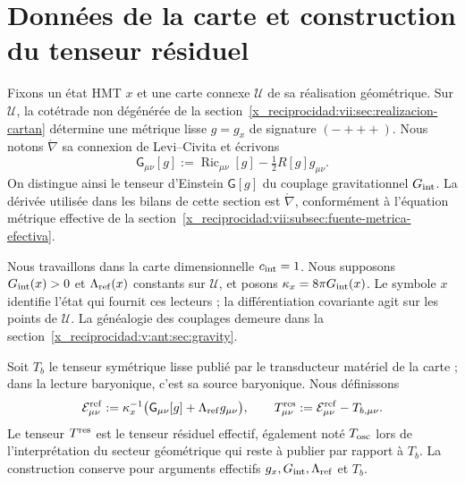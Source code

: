 \section{Données de la carte et construction du tenseur résiduel}
\label{x_reciprocidad:vii:subsec:datos-tensor-residual}

Fixons un état HMT \(x\) et une carte connexe \(\mathcal U\) de sa
réalisation géométrique. Sur \(\mathcal U\), la cotétrade non dégénérée
de la section~\ref{x_reciprocidad:vii:sec:realizacion-cartan} détermine une métrique lisse
\(g=g_x\) de signature \((-+++)\). Nous notons
\(\mathring\nabla\) sa connexion de Levi--Civita et écrivons
\[
 \mathsf G_{\mu\nu}[g]
 :=\operatorname{Ric}_{\mu\nu}[g]-\tfrac12R[g]g_{\mu\nu}.
\]
On distingue ainsi le tenseur d'Einstein \(\mathsf G[g]\) du couplage
gravitationnel \(G_{\rm int}\). La dérivée utilisée dans les bilans
de cette section est \(\mathring\nabla\), conformément à l'équation
métrique effective de la section~\ref{x_reciprocidad:vii:subsec:fuente-metrica-efectiva}.

Nous travaillons dans la carte dimensionnelle \(c_{\rm int}=1\). Nous supposons \(G_{\rm int}(x)>0\) et \(\Lambda_{\rm ref}(x)\) constants sur \(\mathcal U\), et posons \(\kappa_x=8\pi G_{\rm int}(x)\). Le symbole \(x\) identifie l'état qui fournit ces lecteurs ; la différentiation covariante agit sur les points de \(\mathcal U\). La généalogie des couplages demeure dans la section~\ref{x_reciprocidad:v:ant:sec:gravity}.

Soit \(T_b\) le tenseur symétrique lisse publié par le transducteur matériel
de la carte ; dans la lecture baryonique, c'est sa source baryonique. Nous définissons
\begin{equation}
 \mathcal E^{\rm ref}_{\mu\nu}
 :=\kappa_x^{-1}\bigl(\mathsf G_{\mu\nu}[g]
                            +\Lambda_{\rm ref}g_{\mu\nu}\bigr),
 \qquad
 T^{\rm res}_{\mu\nu}:=\mathcal E^{\rm ref}_{\mu\nu}-T_{b,\mu\nu}.
 \label{x_reciprocidad:vii:eq:residual-definicion}
\end{equation}
Le tenseur \(T^{\rm res}\) est le tenseur résiduel effectif, également
noté \(T_{\rm osc}\) lors de l'interprétation du secteur géométrique qui reste
à publier par rapport à \(T_b\). La construction conserve pour
arguments effectifs \(g_x,G_{\rm int},\Lambda_{\rm ref}\) et \(T_b\).

